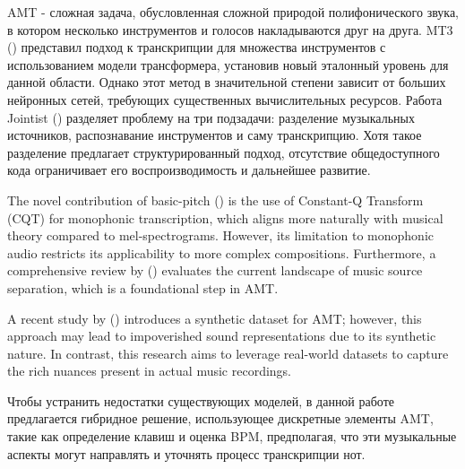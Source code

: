 \documentclass[a4paper, 12pt]{article} %
\begin{document}
AMT - сложная задача, обусловленная сложной природой полифонического звука, в котором несколько инструментов и голосов накладываются друг на друга.  MT3 (\cite{mt3_2021}) представил подход к транскрипции для множества инструментов с использованием модели трансформера, установив новый эталонный уровень для данной области. Однако этот метод в значительной степени зависит от больших нейронных сетей, требующих существенных вычислительных ресурсов. Работа Jointist (\cite{jointist}) разделяет проблему на три подзадачи: разделение музыкальных источников, распознавание инструментов и саму транскрипцию. Хотя такое разделение предлагает структурированный подход, отсутствие общедоступного кода ограничивает его воспроизводимость и дальнейшее развитие.


The novel contribution of basic-pitch (\cite{basic_pitch_2021})
is the use of Constant-Q Transform (CQT) for monophonic transcription, which aligns more naturally with musical theory compared to mel-spectrograms. However, its limitation to monophonic audio restricts its applicability to more complex compositions. Furthermore, a comprehensive review by (\cite{music_source_separation_2023}) evaluates the current landscape of music source separation, which is a foundational step in AMT.

A recent study by (\cite{synthetic_dataset_2023})
introduces a synthetic dataset for AMT; however, this approach may lead to impoverished sound representations due to its synthetic nature. In contrast, this research aims to leverage real-world datasets to capture the rich nuances present in actual music recordings.


Чтобы устранить недостатки существующих моделей, в данной работе предлагается гибридное решение, использующее дискретные элементы AMT, такие как определение клавиш и оценка BPM, предполагая, что эти музыкальные аспекты могут направлять и уточнять процесс транскрипции нот. %
\end{document}
